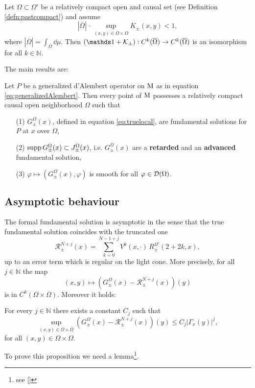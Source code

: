 \begin{prop}
 Let $\Omega\subset\Omega'$ be a relatively compact open and causal set (see Definition \ref{defn:pastcompact}) and assume \begin{equation}
 	|\overline{\Omega}|\,\cdot \sup_{(x,y)\in\overline{\Omega}\times\overline{\Omega}}K_\pm(x,y)<1,
 	\label{eq:small}
 \end{equation} where $|\overline{\Omega}|=\int_{\overline{\Omega}}\dd\mu$. Then $(\id+\mathcal{K}_\pm):C^k(\overline{\Omega})\to C^k(\overline{\Omega})$ is an isomorphism for all $k\in\mathds{N}$.
 \label{prop:piccolezza}
\end{prop}
\noindent The main results are:
\begin{theorem}
	Let $P$ be a generalized d'Alembert operator on $\mathrm{M}$ as in equation \eqref{eq:generalizedAlembert}. Then every point of $\mathrm{M}$ possesses a relatively compact causal open neighborhood $\Omega$ such that
	\begin{itemize}
	\item[(1)] 	$G_\pm^\Omega(x)$, defined in equation \eqref{eq:truelocal}, are fundamental solutions for $P$ at $x$ over $\Omega$,
	\item[(2)] $\text{supp}\,G_\pm^\Omega(x)\subset J_\pm^\Omega(x)$, i.e. $G_\pm^\Omega(x)$ are a \textbf{retarded} and an \textbf{advanced} fundamental solution,
	\item[(3)] $\varphi\mapsto (G_\pm^\Omega(x),\varphi)$ is smooth for all $\varphi\in\mathcal{D}(\Omega)$.
	\end{itemize}
\end{theorem}

\subsection{Asymptotic behaviour}

	The formal fundamental solution is asymptotic in the sense that the true fundamental solution coincides with the truncated one
	\[	\mathcal{R}_\pm	^{N+j}(x)=\sum_{k=0}^{N-1+j}V^k(x,\cdot)\, R_\pm^{\Omega'}(2+2k,x),	\]
	up to an error term which is regular on the light cone. More precisely, for all $j\in\mathbb{N}$ the map
	\begin{equation}
		(x,y)\mapsto(G_\pm^\Omega(x)-\mathcal{R}_\pm^{N+j}(x))(y)
		\label{eq:error}
	\end{equation}
	is in $C^k(\Omega\times\Omega)$. Moreover it holds:
	\begin{prop}
		For every $j\in\mathbb{N}$ there exists a constant $C_j$ such that
		\[	\sup_{(x,y)\in\overline{\Omega}\times\overline{\Omega}}(G_\pm^\Omega(x)-\mathcal{R}_\pm^{N+j}(x))(y)\leq C_j|\Gamma_x(y)|^j,			\]
		for all $(x,y)\in\Omega\times\Omega$.
		\label{prop:asymptotic}
	\end{prop}
	\noindent To prove this proposition we need a lemma\footnote{see [\citealp[Lem 2.2.20]{bar2}]}.
	
